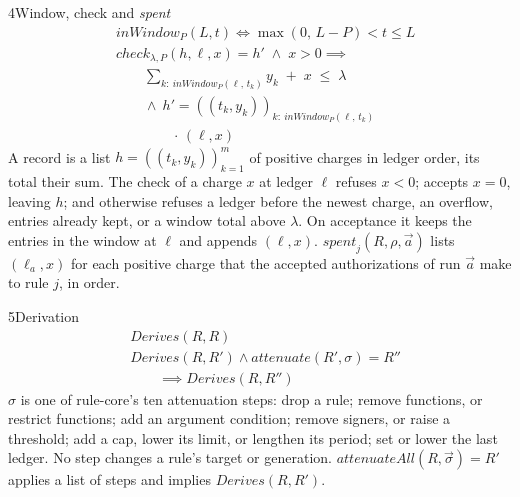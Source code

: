 \begin{perchdefinition}{4}{Window, check and \emph{spent}}\label{def:window-check-and-spent}
\[\begin{aligned}&\mathit{inWindow}_P(L, t) \iff \max(0,\, L - P) < t \le L\\
&\mathit{check}_{\lambda, P}(h, \ell, x) = h' \;\land\; x > 0 \implies\\
&\qquad \sum_{k:\ \mathit{inWindow}_P(\ell,\, t_k)} y_k \;+\; x \;\le\; \lambda\\
&\qquad \land\ h' = ((t_k, y_k))_{k:\ \mathit{inWindow}_P(\ell,\, t_k)}\\
&\qquad\qquad \cdot\, (\ell, x)\end{aligned}\]
A record is a list \(h = ((t_k, y_k))_{k=1}^{m}\) of positive charges in ledger order, its total their sum. The check of a charge \(x\) at ledger \(\ell\) refuses \(x < 0\); accepts \(x = 0\), leaving \(h\); and otherwise refuses a ledger before the newest charge, an overflow,  entries already kept, or a window total above \(\lambda\). On acceptance it keeps the entries in the window at \(\ell\) and appends \((\ell, x)\). \(\mathit{spent}_j(R, \rho, \vec a)\) lists \((\ell_a, x)\) for each positive charge that the accepted authorizations of run \(\vec a\) make to rule \(j\), in order.
\end{perchdefinition}
\begin{perchdefinition}{5}{Derivation}\label{def:derivation}
\[\begin{aligned}&\mathit{Derives}(R, R)\\
&\mathit{Derives}(R, R') \land \mathit{attenuate}(R', \sigma) = R''\\
&\qquad \implies \mathit{Derives}(R, R'')\end{aligned}\]
\(\sigma\) is one of rule-core's ten attenuation steps: drop a rule; remove functions, or restrict functions; add an argument condition; remove signers, or raise a threshold; add a cap, lower its limit, or lengthen its period; set or lower the last ledger. No step changes a rule's target or generation. \(\mathit{attenuateAll}(R, \vec\sigma) = R'\) applies a list of steps and implies \(\mathit{Derives}(R, R')\).
\end{perchdefinition}
